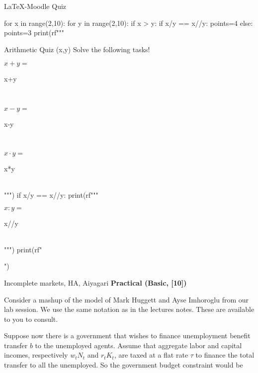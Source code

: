\documentclass{article}
\begin{document}
\begin{quiz}{LaTeX-Moodle Quiz}
    \begin{python}
        for x in range(2,10):
          for y in range(2,10):
            if x > y:
              if x/y == x//y:
                points=4
              else:
                points=3  
              print(rf"""\begin{{cloze}}[points={points}]{{Arithmetic Quiz {(x,y)}}}
              Solve the following tasks!\\
              \begin{{numerical}}
              ${x} + {y} =$
              \item {x+y} 
              \end{{numerical}}\\
              \begin{{numerical}}
              ${x} - {y} =$
              \item {x-y} 
              \end{{numerical}}\\
              \begin{{numerical}}
              ${x} \cdot {y} =$
              \item {x*y} 
              \end{{numerical}}\\""")
              if x/y == x//y:
                print(rf"""\begin{{numerical}}
                ${x} : {y} =$
                \item {x//y} 
                \end{{numerical}}\\""")
              print(rf"\end{{cloze}}")
    \end{python}

    \begin{matching}[shuffle=false]{Incomplete markets, HA, Aiyagari}
        \textbf{Practical (Basic, [10])}

        Consider a mashup of the model of Mark Huggett and Ayse Imhoroglu from our lab session. We use the same notation as in the lectures notes. These are available to you to consult.

        Suppose now there is a government that wishes to finance
        unemployment benefit transfer $b$ to the unemployed agents. Assume
        that aggregate labor and capital incomes, respectively $w_{t}N_{t}$ 
        and $r_{t}K_{t}$, are taxed at a flat rate $\tau$ 
        to finance the total transfer to all the unemployed. So the government budget constraint would be 


\end{matching}
\end{quiz}
\end{document}
